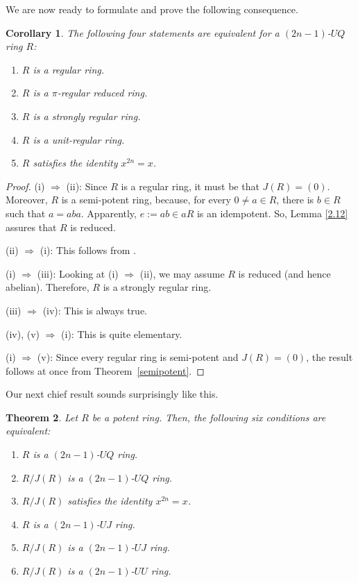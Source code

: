 \documentclass[10pt,a4paper]{amsart}
\newtheorem{theorem}{Theorem}[section]
\newtheorem{corollary}[theorem]{Corollary}
\begin{document}
\medskip

We are now ready to formulate and prove the following consequence.

\begin{corollary}
The following four statements are equivalent for a $(2n-1)$-$UQ$ ring \(R\):
\begin{enumerate}
\item	
$R$ is a regular ring.
\item	
$R$ is a $\pi$-regular reduced ring.
\item	
$R$ is a strongly regular ring.
\item	
$R$ is a unit-regular ring.
\item	
$R$ satisfies the identity $x^{2n}=x$.
\end{enumerate}
\end{corollary}

\begin{proof}
(i) $\Rightarrow$ (ii): Since \( R \) is a regular ring, it must be that \( J(R) = (0) \). Moreover, \( R \) is a semi-potent ring, because, for every \( 0 \neq a \in R \), there is \( b \in R \) such that \( a = aba \). Apparently, \( e := ab \in aR \) is an idempotent. So, Lemma \ref{2.12} assures that \( R \) is reduced.
	
(ii) $\Rightarrow$ (i): This follows from \cite[Theorem 3]{10}.
	
(i) $\Rightarrow$ (iii): Looking at (i) $\Rightarrow$ (ii), we may assume $R$ is reduced (and hence abelian). Therefore, $R$ is a strongly regular ring.
	
(iii) $\Rightarrow$ (iv): This is always true.
	
(iv), (v) $\Rightarrow$ (i): This is quite elementary.
	
(i) $\Rightarrow$ (v): Since every regular ring is semi-potent and $J(R)=(0)$, the result follows at once from Theorem~\ref{semipotent}.
\end{proof}

Our next chief result sounds surprisingly like this.


\begin{theorem}\label{potent}
Let $R$ be a potent ring. Then, the following six conditions are equivalent:
\begin{enumerate}
\item	
$R$ is a $(2n-1)$-$UQ$ ring.
\item	
$R/J(R)$ is a $(2n-1)$-$UQ$ ring.
\item	
$R/J(R)$ satisfies the identity $x^{2n}=x$.
\item	
$R$ is a $(2n-1)$-$UJ$ ring.
\item	
$R/J(R)$ is a $(2n-1)$-$UJ$ ring.
\item	
$R/J(R)$ is a $(2n-1)$-$UU$ ring.
\end{enumerate}
\end{theorem}
\end{document}
